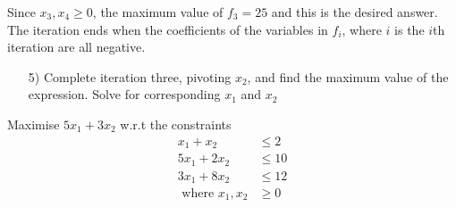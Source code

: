 \documentclass[journal,12pt,twocolumn]{IEEEtran}
\begin{document}
Since $x_3,x_4 \ge 0$, the maximum value of $f_3 = 25 $ and this is the desired answer.  The iteration ends when the coefficients of the variables in $f_i$, where $i$ is the $i$th iteration are
all negative. 
\begin{enumerate}
\item[5)] Complete iteration three, pivoting $x_2$, and find the maximum value of the expression. Solve for corresponding  $x_1$ and $x_2$
\end{enumerate}
\begin{problem}
Maximise $5x_1 + 3x_2$ w.r.t the constraints
\begin{align}
x_1 + x_2 &\leq 2 \nonumber\\
5x_1 + 2x_2 &\leq 10 \nonumber\\
3x_1 + 8x_2 &\leq 12 \nonumber\\
\text{ where } x_1,x_2 &\geq 0 \nonumber
\end{align}
\end{problem}
\end{document}
